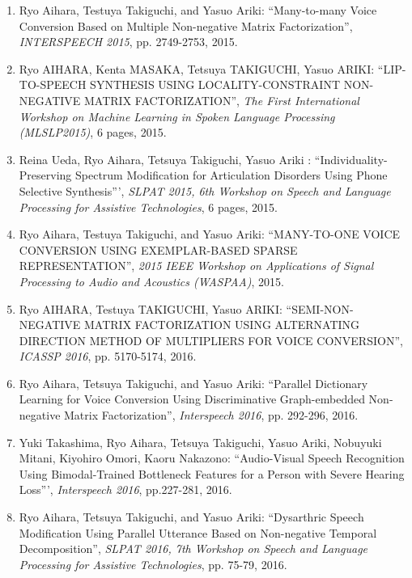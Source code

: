 \begin{enumerate}
\item  Ryo Aihara, Testuya Takiguchi, and Yasuo Ariki:
``Many-to-many Voice Conversion Based on Multiple Non-negative Matrix Factorization'',
\textit{INTERSPEECH 2015}, pp. 2749-2753, 2015.

\item  Ryo AIHARA, Kenta MASAKA, Tetsuya TAKIGUCHI, Yasuo ARIKI:
``LIP-TO-SPEECH SYNTHESIS USING LOCALITY-CONSTRAINT NON-NEGATIVE MATRIX FACTORIZATION'',
\textit{The First International Workshop on Machine Learning in Spoken Language Processing (MLSLP2015)}, 6 pages, 2015.

\item  Reina Ueda, Ryo Aihara, Tetsuya Takiguchi, Yasuo Ariki :
``Individuality-Preserving Spectrum Modification for Articulation Disorders Using Phone Selective Synthesis''',
\textit{SLPAT 2015, 6th Workshop on Speech and Language Processing for Assistive Technologies}, 6 pages, 2015.

\item  Ryo Aihara, Testuya Takiguchi, and Yasuo Ariki:
``MANY-TO-ONE VOICE CONVERSION USING EXEMPLAR-BASED SPARSE REPRESENTATION'',
\textit{2015 IEEE Workshop on Applications of Signal Processing to Audio and Acoustics (WASPAA)}, 2015.

\item Ryo AIHARA, Testuya TAKIGUCHI, Yasuo ARIKI:
``SEMI-NON-NEGATIVE MATRIX FACTORIZATION USING ALTERNATING DIRECTION METHOD OF MULTIPLIERS FOR VOICE CONVERSION'',
\textit{ICASSP 2016}, pp. 5170-5174, 2016.

\item Ryo Aihara, Tetsuya Takiguchi, and Yasuo Ariki:
``Parallel Dictionary Learning for Voice Conversion Using Discriminative Graph-embedded Non-negative Matrix Factorization'',
\textit{Interspeech 2016}, pp. 292-296, 2016.

\item Yuki Takashima, Ryo Aihara, Tetsuya Takiguchi, Yasuo Ariki, Nobuyuki Mitani, Kiyohiro Omori, Kaoru Nakazono:
``Audio-Visual Speech Recognition Using Bimodal-Trained Bottleneck Features for a Person with Severe Hearing Loss''',
\textit{Interspeech 2016}, pp.227-281, 2016.

\item Ryo Aihara, Tetsuya Takiguchi, and Yasuo Ariki:
``Dysarthric Speech Modification Using Parallel Utterance Based on Non-negative Temporal Decomposition'',
\textit{SLPAT 2016, 7th Workshop on Speech and Language Processing for Assistive Technologies}, pp. 75-79, 2016.

\end{enumerate}


